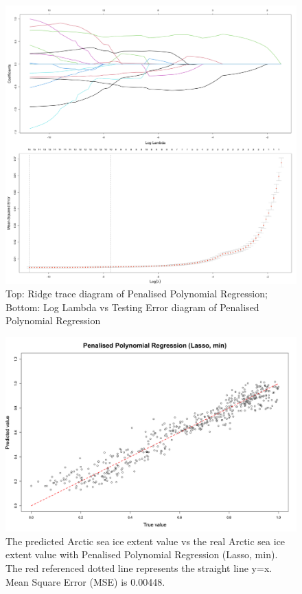 \begin{figure}[htbp]
    \center
    \includegraphics[scale=0.4]{Figure/4.2.3-NEW-PPR-ridge-trance-Log-Lambda.png}
    \caption{Top: Ridge trace diagram of Penalised Polynomial Regression; Bottom: Log Lambda vs Testing Error diagram of Penalised Polynomial Regression}
    \label{4.2.3-NEW-PPR-ridge-trance-Log-Lambda}
\end{figure}


\begin{figure}[htbp]
\centering
\includegraphics[width = 1.0\textwidth]{Figure/4.2.3-PPR-min.png}
\caption{The predicted Arctic sea ice extent value vs the real Arctic sea ice extent value with Penalised Polynomial Regression (Lasso, min). The red referenced dotted line represents the straight line y=x. Mean Square Error (MSE) is 0.00448.}
\label{4.2.3-PPR-min}
\end{figure}

